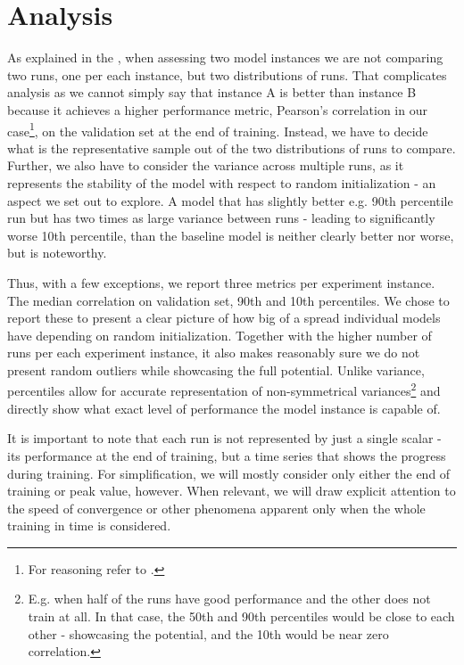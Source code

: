 \section{Analysis}\label{ch:4.3.1}

As explained in the , when assessing two model instances we are not comparing two runs, one per each instance, but two distributions of runs. That complicates analysis as we cannot simply say that instance A is better than instance B because it achieves a higher performance metric, Pearson’s correlation in our case\footnote{For reasoning refer to .}, on the validation set at the end of training. Instead, we have to decide what is the representative sample out of the two distributions of runs to compare. Further, we also have to consider the variance across multiple runs, as it represents the stability of the model with respect to random initialization - an aspect we set out to explore. A model that has slightly better e.g. 90th percentile run but has two times as large variance between runs - leading to significantly worse 10th percentile, than the baseline model is neither clearly better nor worse, but is noteworthy. 

Thus, with a few exceptions, we report three metrics per experiment instance. The median correlation on validation set, 90th and 10th percentiles. We chose to report these to present a clear picture of how big of a spread individual models have depending on random initialization. Together with the higher number of runs per each experiment instance, it also makes reasonably sure we do not present random outliers while showcasing the full potential. Unlike variance, percentiles allow for accurate representation of non-symmetrical variances\footnote{E.g. when half of the runs have good performance and the other does not train at all. In that case, the 50th and 90th percentiles would be close to each other - showcasing the potential, and the 10th would be near zero correlation.} and directly show what exact level of performance the model instance is capable of.

It is important to note that each run is not represented by just a single scalar - its performance at the end of training, but a time series that shows the progress during training. For simplification, we will mostly consider only either the end of training or peak value, however. When relevant, we will draw explicit attention to the speed of convergence or other phenomena apparent only when the whole training in time is considered.

